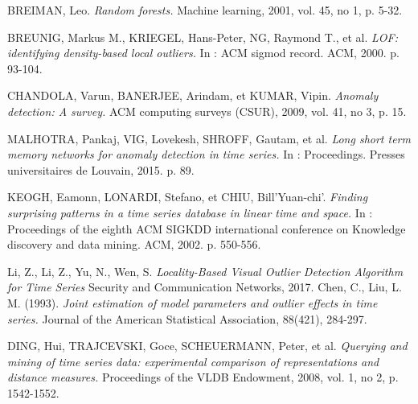 \begin{thebibliography}{1}
BREIMAN, Leo. 
\emph{Random forests.}
Machine learning, 2001, vol. 45, no 1, p. 5-32.

	 BREUNIG, Markus M., KRIEGEL, Hans-Peter, NG, Raymond T., et al. 
	 \emph{LOF: identifying density-based local outliers.} 
	 In : ACM sigmod record. ACM, 2000. p. 93-104.
	  
	  CHANDOLA, Varun, BANERJEE, Arindam, et KUMAR, Vipin. 
	  \emph{Anomaly detection: A survey.}
	   ACM computing surveys (CSUR), 2009, vol. 41, no 3, p. 15.
	   
	MALHOTRA, Pankaj, VIG, Lovekesh, SHROFF, Gautam, et al.
	\emph{Long short term memory networks for anomaly detection in time series.} 
	In : Proceedings. Presses universitaires de Louvain, 2015. p. 89.
	   
   KEOGH, Eamonn, LONARDI, Stefano, et CHIU, Bill'Yuan-chi'. 
   \emph{Finding surprising patterns in a time series database in linear time and space.} In : Proceedings of the eighth ACM SIGKDD international conference on Knowledge discovery and data mining. ACM, 2002. p. 550-556.
	   
Li, Z., Li, Z., Yu, N., Wen, S. 	   
	   \emph{Locality-Based Visual Outlier Detection Algorithm for Time Series}
	   Security and Communication Networks, 2017.  
	Chen, C., Liu, L. M. (1993).
\emph{Joint estimation of model parameters and outlier effects in time series.}
Journal of the American Statistical Association, 88(421), 284-297.	   

DING, Hui, TRAJCEVSKI, Goce, SCHEUERMANN, Peter, et al. 
\emph{Querying and mining of time series data: experimental comparison of representations and distance measures.}
 Proceedings of the VLDB Endowment, 2008, vol. 1, no 2, p. 1542-1552.	
	
	
	   
\end{thebibliography}

